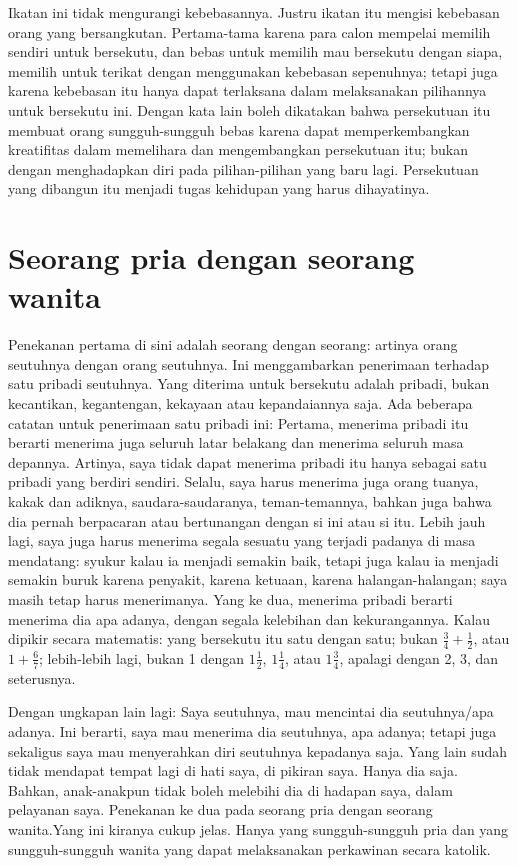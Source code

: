 Ikatan ini tidak mengurangi kebebasannya. Justru ikatan itu mengisi kebebasan orang yang bersangkutan. Pertama-tama karena para calon mempelai memilih sendiri untuk bersekutu, dan bebas un­tuk memilih mau bersekutu dengan siapa, memilih untuk terikat dengan menggunakan kebebasan sepenuhnya; tetapi juga karena kebebasan itu hanya dapat terlaksana dalam melaksanakan pilihannya untuk bersekutu ini. Dengan kata lain boleh dikatakan bahwa persekutuan itu membuat orang sungguh-sungguh bebas karena dapat memperkem­bangkan kreatifitas dalam memelihara dan mengembangkan persekutuan itu; bukan dengan menghadapkan diri pada pilihan-pilihan yang baru lagi. Persekutuan yang dibangun itu menjadi tugas kehidupan yang harus dihayatinya.


\section{Seorang pria dengan seorang wanita}
Penekanan pertama di sini adalah seorang dengan seorang: arti­nya orang seutuhnya dengan orang seutuhnya. Ini menggambarkan penerimaan terhadap satu pribadi seutuhnya. Yang diterima untuk bersekutu adalah pribadi, bukan kecantikan, kegantengan, kekayaan atau kepandaiannya saja. Ada beberapa catatan untuk penerimaan satu pribadi ini: Pertama, menerima pribadi itu berarti menerima juga seluruh latar belakang dan menerima seluruh masa depannya. Artinya, saya tidak dapat menerima pribadi itu hanya sebagai satu pribadi yang berdiri sendiri. Selalu, saya harus menerima juga orang tuanya, kakak dan adiknya, saudara-saudaranya, teman-teman­nya, bahkan juga bahwa dia pernah berpacaran atau bertunangan dengan si ini atau si itu. Lebih jauh lagi, saya juga harus meneri­ma segala sesuatu yang terjadi padanya di masa mendatang: syukur kalau ia menjadi semakin baik, tetapi juga kalau ia menjadi sema­kin buruk karena penyakit, karena ketuaan, karena halangan-halangan; saya masih tetap harus menerimanya. Yang ke dua, menerima pribadi berarti menerima dia apa adanya, dengan segala kelebihan dan kekurangannya. Kalau dipikir secara matematis: yang berseku­tu itu satu dengan satu; bukan $\frac{3}{4} + \frac{1}{2}$, atau $1 + \frac{6}{7}$; lebih-le­bih lagi, bukan 1 dengan $1\frac{1}{2}$, $1\frac{1}{4}$, atau $1\frac{3}{4}$, apalagi dengan 2, 3, dan seterusnya.

Dengan ungkapan lain lagi: Saya seutuhnya, mau mencintai dia seutuhnya/apa adanya. Ini berarti, saya mau menerima dia seutuh­nya, apa adanya; tetapi juga sekaligus saya mau menyerahkan diri seutuhnya kepadanya saja. Yang lain sudah tidak mendapat tempat lagi di hati saya, di pikiran saya. Hanya dia saja. Bahkan, anak-anakpun tidak boleh melebihi dia di hadapan saya, dalam pelayanan saya.
Penekanan ke dua pada seorang pria dengan seorang wanita.Yang ini kiranya cukup jelas. Hanya yang sungguh-sungguh pria dan yang sungguh-sungguh wanita yang dapat melaksanakan perkawinan secara katolik.


